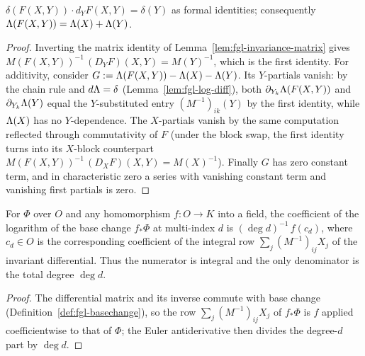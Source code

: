\begin{lemma}
\label{lem:fgl-invariance}
\leanok
{}
$\delta(F(X,Y))\cdot d_Y F(X,Y) = \delta(Y)$ as formal identities; consequently
$\Lambda(F(X,Y)) = \Lambda(X) + \Lambda(Y)$.
\end{lemma}
\begin{proof}
\leanok
Inverting the matrix identity of Lemma~\ref{lem:fgl-invariance-matrix} gives
$M(F(X,Y))^{-1}\,(D_Y F)(X,Y) = M(Y)^{-1}$, which is the first identity. For
additivity, consider $G := \Lambda(F(X,Y)) - \Lambda(X) - \Lambda(Y)$. Its $Y$-partials vanish:
by the chain rule and $d\Lambda = \delta$ (Lemma~\ref{lem:fgl-log-diff}), both
$\partial_{Y_k}\Lambda(F(X,Y))$ and $\partial_{Y_k}\Lambda(Y)$ equal the $Y$-substituted
entry $(M^{-1})_{ik}(Y)$ by the first identity, while $\Lambda(X)$ has no $Y$-dependence.
The $X$-partials vanish by the same computation reflected through commutativity of $F$
(under the block swap, the first identity turns into its $X$-block counterpart
$M(F(X,Y))^{-1}\,(D_X F)(X,Y) = M(X)^{-1}$). Finally $G$ has zero constant term, and in
characteristic zero a series with vanishing constant term and vanishing first partials
is zero.
\end{proof}

\begin{lemma}
\label{lem:log-coeff-integral}
\leanok
{}
For $\Phi$ over $O$ and any homomorphism $f \colon O \to K$ into a field, the
coefficient of the logarithm of the base change $f_*\Phi$ at multi-index $d$ is
$(\deg d)^{-1}\, f(c_d)$, where $c_d \in O$ is the corresponding coefficient of the
integral row $\sum_j (M^{-1})_{ij} X_j$ of the invariant differential. Thus the
numerator is integral and the only denominator is the total degree $\deg d$.
\end{lemma}
\begin{proof}
\leanok
The differential matrix and its inverse commute with base change
(Definition~\ref{def:fgl-basechange}), so the row $\sum_j (M^{-1})_{ij} X_j$ of
$f_*\Phi$ is $f$ applied coefficientwise to that of $\Phi$; the Euler antiderivative
then divides the degree-$d$ part by $\deg d$.
\end{proof}

